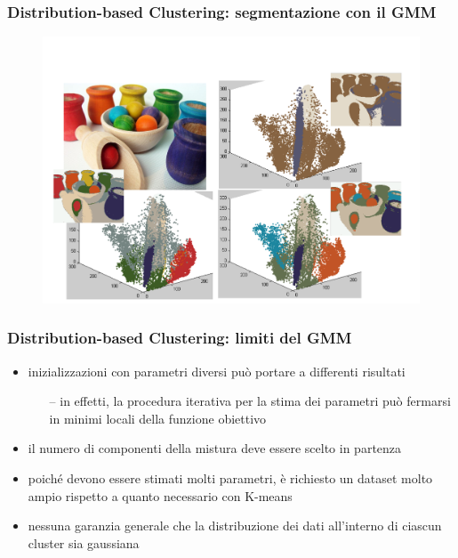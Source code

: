 \begin{frame}

	\frametitle{{\color{GradientDescentDiagramOrange}Distribution-based Clustering}: segmentazione con il GMM}

		\begin{figure}[!htbp]
				\centering
				\includegraphics[angle=0,width=0.9\linewidth]{images/unsupervised/gaussian_mixture/gmm_pots.pdf}
			\end{figure}

\end{frame}


\begin{frame}

	\frametitle{{\color{GradientDescentDiagramOrange}Distribution-based Clustering}: limiti del GMM}

		\begin{itemize}
			\item inizializzazioni con parametri diversi può portare a differenti risultati
				\begin{itemize}
					\item[--] in effetti, la procedura iterativa per la stima dei parametri può fermarsi in minimi locali della funzione obiettivo
				\end{itemize}
			\item  il numero di componenti della mistura deve essere scelto in partenza
			\item poiché devono essere stimati molti parametri, è richiesto un dataset molto ampio rispetto a quanto necessario con K-means
			\item nessuna garanzia generale che la distribuzione dei dati all'interno di ciascun cluster sia gaussiana
		\end{itemize}

\end{frame}


